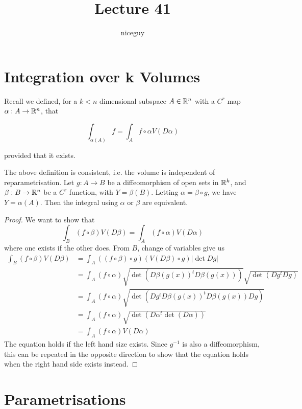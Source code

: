 \documentclass[12pt]{article}
\title{Lecture 41}
\author{niceguy}
\begin{document}
\maketitle

\section{Integration over k Volumes}

Recall we defined, for a $k < n$ dimensional subspace $A \in \mathbb{R}^n$ with a $C^r$ map $\alpha: A \rightarrow \mathbb{R}^n$, that

$$\int_{\alpha(A)} f = \int_A f\circ\alpha V(D\alpha)$$

provided that it exists.

\begin{thm}
    The above definition is consistent, i.e. the volume is independent of reparametrisation. Let $g:A \rightarrow B$ be a diffeomorphism of open sets in $\mathbb{R}^k$, and $\beta:B \rightarrow \mathbb{R}^n$ be a $C^r$ function, with $Y = \beta(B)$. Letting $\alpha = \beta\circ g$, we have $Y = \alpha(A)$. Then the integral using $\alpha$ or $\beta$ are equivalent.
\end{thm}

\begin{proof}
    We want to show that
    $$\int_B (f\circ\beta)V(D\beta) = \int_A (f\circ\alpha)V(D\alpha)$$
    where one exists if the other does. From $B$, change of variables give us
    \begin{align*}
        \int_B (f\circ\beta)V(D\beta) &= \int_A ((f\circ\beta)\circ g)(V(D\beta)\circ g)|\det Dg| \\
                                      &= \int_A (f\circ\alpha) \sqrt{\det(D\beta(g(x))^tD\beta(g(x)))}\sqrt{\det(Dg^tDg)} \\
                                      &= \int_A (f\circ\alpha) \sqrt{\det(Dg^tD\beta(g(x))^tD\beta(g(x))Dg)} \\
                                      &= \int_A (f\circ\alpha) \sqrt{\det(D\alpha^t\det(D\alpha))} \\
                                      &= \int_A (f\circ\alpha) V(D\alpha)
    \end{align*}
    The equation holds if the left hand size exists. Since $g^{-1}$ is also a diffeomorphism, this can be repeated in the opposite direction to show that the equation holds when the right hand side exists instead.
\end{proof}

\section{Parametrisations}
\end{document}
